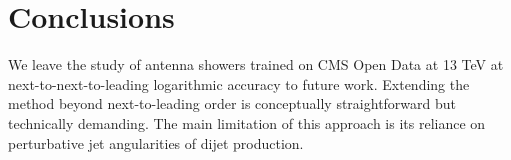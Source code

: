 \section{Conclusions}\label{sec:conclusions}

We leave the study of antenna showers trained on CMS Open Data at 13 TeV
at next-to-next-to-leading logarithmic accuracy to future work.
Extending the method beyond next-to-leading order is conceptually
straightforward but technically demanding. The main limitation of this
approach is its reliance on perturbative jet angularities of dijet
production.


